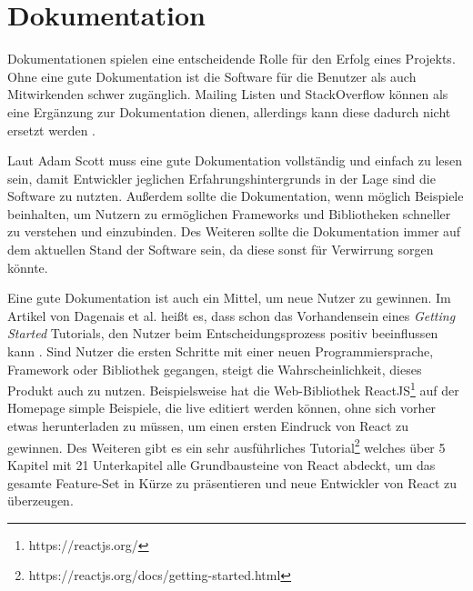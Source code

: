 \section{Dokumentation} \label{sec:Documentation}


Dokumentationen spielen eine entscheidende Rolle für den Erfolg eines Projekts.
Ohne eine gute Dokumentation ist die Software für die Benutzer als auch Mitwirkenden schwer zugänglich.
Mailing Listen und StackOverflow können als eine Ergänzung zur Dokumentation dienen, allerdings kann
diese dadurch nicht ersetzt werden \cite{bangerthWhatMakesComputational2013}. %

\bigskip
\noindent


\noindent
Laut Adam Scott muss eine gute Dokumentation vollständig und einfach zu lesen sein, damit Entwickler
jeglichen Erfahrungshintergrunds in der Lage sind die Software zu nutzten. Außerdem sollte 
die Dokumentation, wenn möglich Beispiele beinhalten, um Nutzern zu ermöglichen Frameworks und Bibliotheken 
schneller zu verstehen und einzubinden. Des Weiteren sollte die Dokumentation immer auf dem aktuellen 
Stand der Software sein, da diese sonst für Verwirrung sorgen könnte.
\cite{scottEightRulesGood2018}


Eine gute Dokumentation ist auch ein Mittel, um neue Nutzer zu gewinnen. Im Artikel von Dagenais et al. heißt es,
dass schon das Vorhandensein eines \textit{Getting Started} Tutorials, den Nutzer beim
Entscheidungsprozess positiv beeinflussen kann \cite{dagenaisDeveloperDocumentation}. %
Sind Nutzer die ersten Schritte mit einer neuen Programmiersprache, Framework oder Bibliothek
gegangen, steigt die Wahrscheinlichkeit, dieses Produkt auch zu nutzen.
Beispielsweise hat die Web-Bibliothek ReactJS\footnote{https://reactjs.org/} auf der Homepage simple
Beispiele, die live editiert werden können, ohne sich vorher etwas herunterladen zu müssen, um einen
ersten Eindruck von React zu gewinnen.
Des Weiteren gibt es ein sehr ausführliches Tutorial\footnote{https://reactjs.org/docs/getting-started.html}
welches über 5 Kapitel mit 21 Unterkapitel alle Grundbausteine von React abdeckt, um das gesamte
Feature-Set in Kürze zu präsentieren und neue Entwickler von React zu überzeugen.

